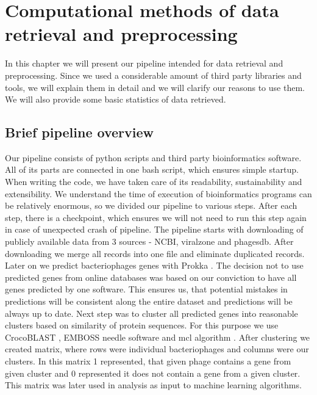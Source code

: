 
\chapter{Computational methods of data retrieval and preprocessing}
In this chapter we will present our pipeline intended for data retrieval and preprocessing.
Since we used a considerable amount of third party libraries and tools, we will explain them in detail and we will clarify our reasons to use them.
We will also provide some basic statistics of data retrieved.

\section{Brief pipeline overview}
Our pipeline consists of python scripts and third party bioinformatics software.
All of its parts are connected in one bash script, which ensures simple startup.
When writing the code, we have taken care of its readability, sustainability and extensibility.
We understand the time of execution of bioinformatics programs can be relatively enormous, so we divided our pipeline to various steps.
After each step, there is a checkpoint, which ensures we will not need to run this step again in case of unexpected crash of pipeline.
The pipeline starts with downloading of publicly available data from 3 sources - NCBI, viralzone and phagesdb.
After downloading we merge all records into one file and eliminate duplicated records.
Later on we predict bacteriophages genes with Prokka \cite{prokka}.
The decision not to use predicted genes from online databases was based on our conviction to have all genes predicted by one software.
This ensures us, that potential mistakes in predictions will be consistent along the entire dataset and predictions will be always up to date.
Next step was to cluster all predicted genes into reasonable clusters based on similarity of protein sequences.
For this purpose we use CrocoBLAST \cite{crocoblast}, EMBOSS needle software \cite{needle} and mcl algorithm \cite{mcl}.
After clustering we created matrix, where rows were individual bacteriophages and columns were our clusters.
In this matrix 1 represented, that given phage contains a gene from given cluster and 0 represented it does not contain a gene from a given cluster.
This matrix was later used in analysis as input to machine learning algorithms.

